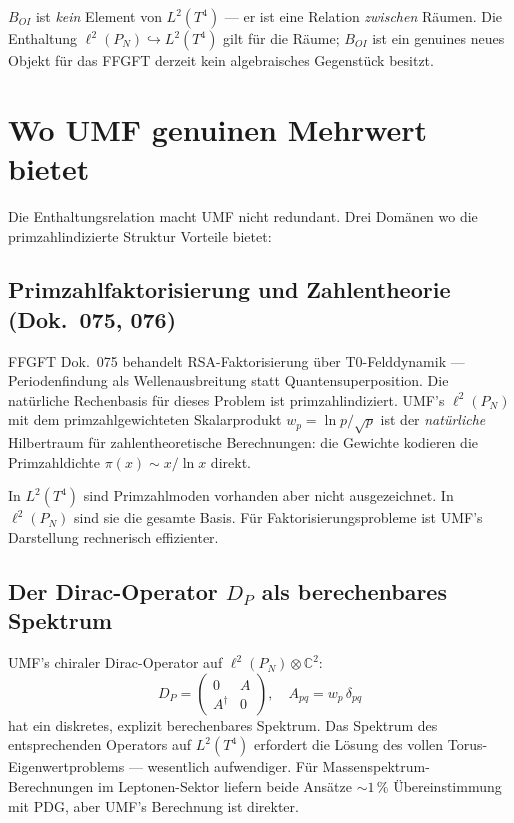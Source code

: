 $B_{OI}$ ist \emph{kein} Element von $L^2(T^4)$ — er ist eine Relation
\emph{zwischen} Räumen. Die Enthaltung $\ell^2(P_N) \hookrightarrow L^2(T^4)$
gilt für die Räume; $B_{OI}$ ist ein genuines neues Objekt für das FFGFT
derzeit kein algebraisches Gegenstück besitzt.

\section{Wo UMF genuinen Mehrwert bietet}

Die Enthaltungsrelation macht UMF nicht redundant. Drei Domänen wo die
primzahlindizierte Struktur Vorteile bietet:

\subsection{Primzahlfaktorisierung und Zahlentheorie (Dok.~075, 076)}

FFGFT Dok.~075 behandelt RSA-Faktorisierung über T0-Felddynamik —
Periodenfindung als Wellenausbreitung statt Quantensuperposition. Die natürliche
Rechenbasis für dieses Problem ist primzahlindiziert. UMF's $\ell^2(P_N)$ mit
dem primzahlgewichteten Skalarprodukt $w_p = \ln p/\sqrt{p}$ ist der
\emph{natürliche} Hilbertraum für zahlentheoretische Berechnungen: die Gewichte
kodieren die Primzahldichte $\pi(x) \sim x/\ln x$ direkt.

In $L^2(T^4)$ sind Primzahlmoden vorhanden aber nicht ausgezeichnet. In
$\ell^2(P_N)$ sind sie die gesamte Basis. Für Faktorisierungsprobleme ist
UMF's Darstellung rechnerisch effizienter.

\subsection{Der Dirac-Operator \texorpdfstring{$D_P$}{D\_P} als berechenbares Spektrum}

UMF's chiraler Dirac-Operator auf $\ell^2(P_N) \otimes \mathbb{C}^2$:
\begin{equation}
  D_P = \begin{pmatrix} 0 & A \\ A^\dagger & 0 \end{pmatrix},
  \quad A_{pq} = w_p\,\delta_{pq}
  \tag{244.5}
\end{equation}
hat ein diskretes, explizit berechenbares Spektrum. Das Spektrum des
entsprechenden Operators auf $L^2(T^4)$ erfordert die Lösung des vollen
Torus-Eigenwertproblems — wesentlich aufwendiger. Für Massenspektrum-
Berechnungen im Leptonen-Sektor liefern beide Ansätze $\sim 1\,\%$
Übereinstimmung mit PDG, aber UMF's Berechnung ist direkter.

